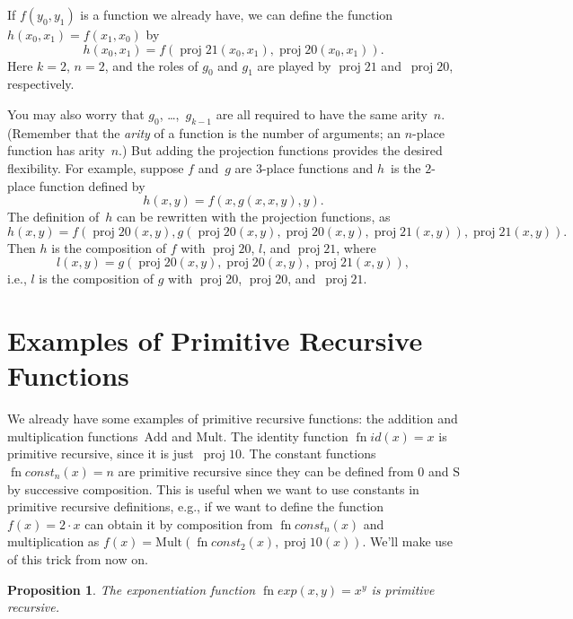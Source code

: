 \documentclass[10pt,a4paper]{article}
\theoremstyle{plain}
\newtheorem{prop}[thm]{Proposition}
\theoremstyle{definition}
\theoremstyle{remark}
\newcommand*{\olfileid}[3]{}
\newcommand*{\olsection}[1]{\section*{#1}}
\providecommand{\Mult}{\ensuremath{\mathrm{Mult}}}
\providecommand{\Add}{\ensuremath{\mathrm{Add}}}
\providecommand{\Zero}{\ensuremath{0}}
\providecommand{\Succ}{\ensuremath{\mathrm{S}}}
\providecommand{\Proj}{\operatorname{proj}}
\providecommand{\fn}{\operatorname{fn}}
\providecommand{\fn}{\operatorname{fn}}
\begin{document}
If $f(y_0, y_1)$ is a function we already have, we can define the
function $h(x_0, x_1) = f(x_1, x_0)$ by
\[
h(x_0, x_1) = f(\Proj{2}{1}(x_0, x_1),\Proj{2}{0}(x_0, x_1)).
\]
Here $k=2$, $n = 2$, and the roles of $g_0$ and $g_1$ are played by
$\Proj{2}{1}$ and~$\Proj{2}{0}$, respectively.

You may also worry that $g_0$, \dots,~$g_{k-1}$ are all required
to have the same arity~$n$. (Remember that the \emph{arity} of a
function is the number of arguments; an $n$-place function has
arity~$n$.) But adding the projection functions provides the desired
flexibility. For example, suppose $f$ and~$g$ are $3$-place functions
and $h$~is the $2$-place function defined by
\[
h(x,y) = f(x,g(x,x,y),y).
\]
The definition of~$h$ can be rewritten with the projection
functions, as
\[
h(x,y) = f(\Proj{2}{0}(x,y), g(\Proj{2}{0}(x,y), \Proj{2}{0}(x,y),
\Proj{2}{1}(x,y)), \Proj{2}{1}(x,y)).
\]
Then $h$ is the composition of $f$ with $\Proj{2}{0}$, $l$, and
$\Proj{2}{1}$, where
\[
l(x,y) = g(\Proj{2}{0}(x,y),\Proj{2}{0}(x,y),\Proj{2}{1}(x,y)),
\]
i.e., $l$ is the composition of $g$ with $\Proj{2}{0}$, $\Proj{2}{0}$,
and~$\Proj{2}{1}$.





\olfileid{cmp}{rec}{exa}
\olsection{Examples of Primitive Recursive Functions}


We already have some examples of primitive recursive functions: the
addition and multiplication functions~$\Add$ and $\Mult$.  The
identity function $\fn{id}(x) = x$ is primitive recursive, since it is
just~$\Proj{1}{0}$. The constant functions $\fn{const}_n(x) = n$ are
primitive recursive since they can be defined from $\Zero$ and $\Succ$
by successive composition. This is useful when we want to use
constants in primitive recursive definitions, e.g., if we want to
define the function $f(x) = 2 \cdot x$ can obtain it by composition
from $\fn{const}_n(x)$ and multiplication as $f(x) =
\Mult(\fn{const}_2(x), \Proj{1}{0}(x))$. We'll make use of this trick
from now on.

\begin{prop}
  The exponentiation function $\fn{exp}(x, y) = x^y$ is primitive recursive.
\end{prop}
\end{document}
